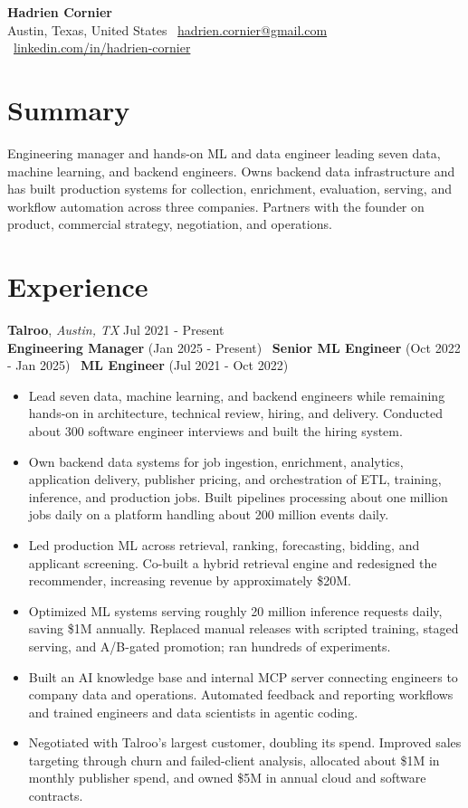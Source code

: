 \documentclass[a4paper,9pt]{article}
\begin{document}
\begin{center}
  {\LARGE\textbf{Hadrien Cornier}}\\[1.5mm]
  Austin, Texas, United States \textbar\
  \href{mailto:hadrien.cornier@gmail.com}{hadrien.cornier@gmail.com} \textbar\
  \href{https://linkedin.com/in/hadrien-cornier}{linkedin.com/in/hadrien-cornier}
\end{center}

\vspace{-1mm}
\section*{Summary}
Engineering manager and hands-on ML and data engineer leading seven data, machine learning, and backend engineers. Owns backend data infrastructure and has built production systems for collection, enrichment, evaluation, serving, and workflow automation across three companies. Partners with the founder on product, commercial strategy, negotiation, and operations.

\section*{Experience}

\textbf{Talroo}, \textit{Austin, TX} \hfill Jul 2021 - Present\\[-0.5mm]
\textbf{Engineering Manager} (Jan 2025 - Present) \textbar\
\textbf{Senior ML Engineer} (Oct 2022 - Jan 2025) \textbar\
\textbf{ML Engineer} (Jul 2021 - Oct 2022)
\begin{itemize}
  \item Lead seven data, machine learning, and backend engineers while remaining hands-on in architecture, technical review, hiring, and delivery. Conducted about 300 software engineer interviews and built the hiring system.
  \item Own backend data systems for job ingestion, enrichment, analytics, application delivery, publisher pricing, and orchestration of ETL, training, inference, and production jobs. Built pipelines processing about one million jobs daily on a platform handling about 200 million events daily.
  \item Led production ML across retrieval, ranking, forecasting, bidding, and applicant screening. Co-built a hybrid retrieval engine and redesigned the recommender, increasing revenue by approximately \$20M.
  \item Optimized ML systems serving roughly 20 million inference requests daily, saving \$1M annually. Replaced manual releases with scripted training, staged serving, and A/B-gated promotion; ran hundreds of experiments.
  \item Built an AI knowledge base and internal MCP server connecting engineers to company data and operations. Automated feedback and reporting workflows and trained engineers and data scientists in agentic coding.
  \item Negotiated with Talroo's largest customer, doubling its spend. Improved sales targeting through churn and failed-client analysis, allocated about \$1M in monthly publisher spend, and owned \$5M in annual cloud and software contracts.
\end{itemize}
\end{document}
